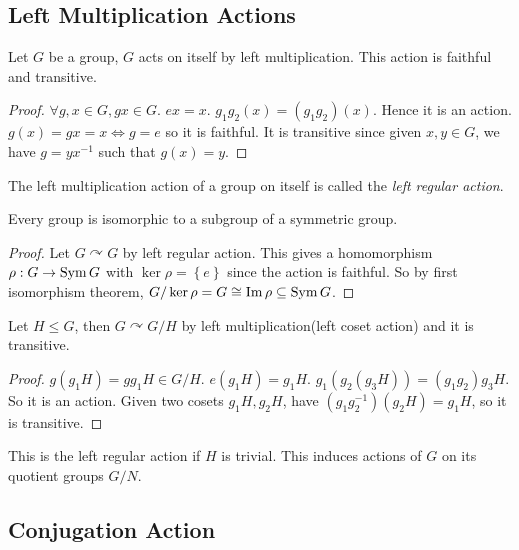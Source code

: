 \documentclass[a4paper]{article}
\begin{document}
\subsection{Left Multiplication Actions}
\begin{lemma}\label{lma:5.13}
  Let $G$ be a group, $G$ acts on itself by left multiplication. This
  action is faithful and transitive.
\end{lemma}
\begin{proof}
  $ \forall g,x\in G, gx\in G $. $ ex=x $. $ g_1g_2(x)=(g_1g_2)(x) $.
  Hence it is an action. $ g(x)=gx=x \Leftrightarrow g=e $ so it is
  faithful. It is transitive since given $x,y\in G$, we have
  $g=yx^{-1}$ such that $g(x)=y$.
\end{proof}
\begin{definition}
  The left multiplication action of a group on itself is called the
  \textit{left regular action}.
\end{definition}
\begin{theorem}[Cayley]\label{thm:Cayley}
  Every group is isomorphic to a subgroup of a symmetric group.
\end{theorem}
\begin{proof}
  Let $ G \curvearrowright G $ by left regular action. This gives a
  homomorphism $ \rho: G \to \operatorname{Sym} G $ with $ \ker \rho=\left\{ e
  \right\} $ since the action is faithful. So by first isomorphism
  theorem, $G/\ker \rho=G \cong \operatorname{Im} \rho \subseteq \operatorname{Sym} G$.
\end{proof}
\begin{proposition}\label{prop:5.16}
  Let $H\le G$, then $G \curvearrowright G/H$ by left
  multiplication(left coset action) and it is transitive.
\end{proposition}
\begin{proof}
  $ g(g_1H)=gg_1H\in G/H $. $ e(g_1H)=g_1H $. $
  g_1(g_2(g_3H))=(g_1g_2)g_3H $. So it is an action. Given two cosets
  $ g_1H,g_2H $, have $ (g_1g_2^{-1})(g_2H)=g_1H $, so it is transitive.
\end{proof}
\begin{remark}
  This is the left regular action if $H$ is trivial. This induces
  actions of $G$ on its quotient groups $G/N$.
\end{remark}
\subsection{Conjugation Action}
\end{document}
